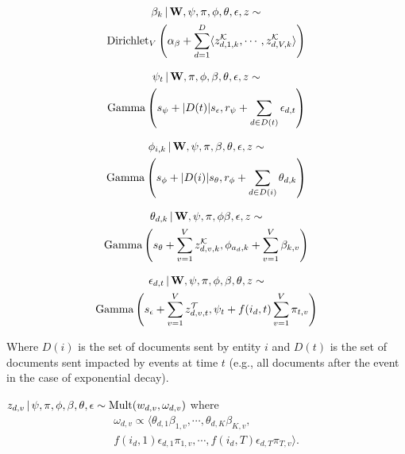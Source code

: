 \begin{multline}
\beta_k \, | \, \mathbf{W}, \psi, \pi, \phi, \theta, \epsilon, z \sim \\
	\mbox{Dirichlet}_V\left(\alpha_\beta + \sum_{d=1}^D \langle
		z^\mathcal{K}_{d,1,k}, \cdots, z^\mathcal{K}_{d,V,k}\rangle
	\right)
\label{eq:beta}
\end{multline}

\begin{multline}
\psi_t \, | \, \mathbf{W}, \pi, \phi, \beta, \theta, \epsilon, z \sim \\
	\mbox{Gamma}\left(
		s_\psi + |D(t)| s_\epsilon,
		r_\psi + \sum_{d\in D(t)} \epsilon_{d,t}
	\right)
\label{eq:psi}
\end{multline}

\begin{multline}
\phi_{i,k} \, | \, \mathbf{W}, \psi, \pi, \beta, \theta, \epsilon, z \sim \\
	\mbox{Gamma}\left(
		s_\phi + |D(i)| s_\theta,
		r_\phi + \sum_{d\in D(i)} \theta_{d,k}
	\right)
\label{eq:phi}
\end{multline}

\begin{multline}
\theta_{d,k} \, | \, \mathbf{W}, \psi, \pi, \phi \beta, \epsilon, z \sim \\
	\mbox{Gamma}\left(
		s_\theta + \sum_{v=1}^V z^\mathcal{K}_{d,v,k},
		\phi_{a_d,k} + \sum_{v=1}^V \beta_{k,v}
	\right)
\label{eq:theta}
\end{multline}

\begin{multline}
\epsilon_{d,t} \, | \, \mathbf{W}, \psi, \pi, \phi, \beta, \theta, z \sim \\
	\mbox{Gamma}\left(
		s_\epsilon + \sum_{v=1}^V z^\mathcal{T}_{d,v,t},
		\psi_t + f(i_d, t) \sum_{v=1}^V \pi_{t,v}
	\right)
\label{eq:epsilon}
\end{multline}

Where $D(i)$ is the set of documents sent by entity $i$ and $D(t)$ is the set of documents sent impacted by events at time $t$ (e.g., all documents after the event in the case of exponential decay).

$z_{d,v} \, | \, \psi, \pi, \phi, \beta, \theta, \epsilon \sim \mbox{Mult}(w_{d,v}, \omega_{d,v})$ where
\begin{multline}
\omega_{d,v} \propto \langle 
\theta_{d,1} \beta_{1,v}, \cdots, \theta_{d,K} \beta_{K,v}, \\
f(i_d, 1) \epsilon_{d,1} \pi_{1,v}, \cdots, f(i_d, T) \epsilon_{d,T} \pi_{T,v}\rangle.
\label{eq:omega}
\end{multline}

